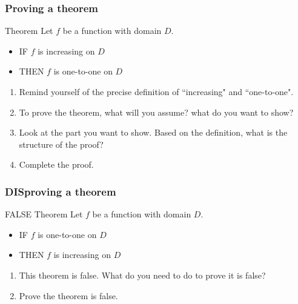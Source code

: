 \documentclass[14pt]{beamer}
\begin{document}
\begin{frame}
	\frametitle{Proving a theorem}

	\begin{block}{Theorem}
		Let $f$ be a function with domain $D$.
		\begin{itemize}
			\item IF $f$ is increasing on $\displaystyle D$

			\item THEN $f$ is one-to-one on $\displaystyle D$
		\end{itemize}
	\end{block}

	\vfill

	\begin{enumerate}
		\item Remind yourself of the precise definition of ``increasing" and ``one-to-one".

		\item To prove the theorem, what will you assume? what do you want to show?

		\item Look at the part you want to show. Based on the definition, what is the
			structure of the proof?

		\item Complete the proof.
	\end{enumerate}
\end{frame}

\begin{frame}
	\frametitle{DISproving a theorem}

	\begin{block}{ FALSE Theorem}
		Let $f$ be a function with domain $D$.
		\begin{itemize}
			\item IF $f$ is one-to-one on $\displaystyle D$

			\item THEN $f$ is increasing on $\displaystyle D$
		\end{itemize}
	\end{block}

	\vfill

	\begin{enumerate}
		\item This theorem is false. What do you need to do to prove it is false?

		\item Prove the theorem is false.
	\end{enumerate}
\end{frame}
\end{document}
